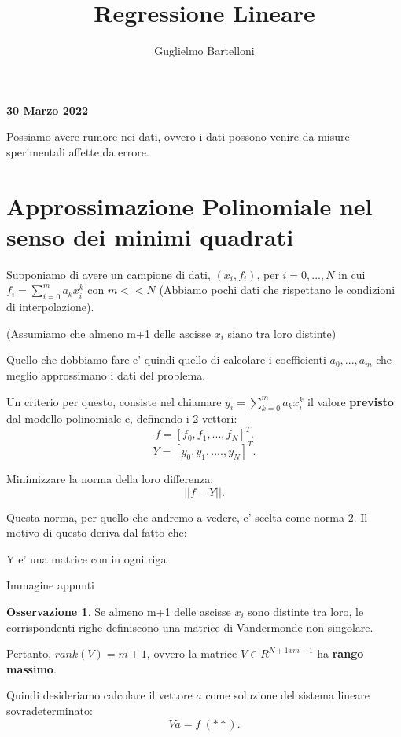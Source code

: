 \documentclass[11pt]{article}
\theoremstyle{definition}
\newtheorem{oss}{Osservazione}
\theoremstyle{plain}
\begin{document}
\title{Regressione Lineare}
\author{Guglielmo Bartelloni}
\maketitle

\thispagestyle{empty}

\begin{center}
{\LARGE \bf 30 Marzo 2022}\\
\end{center}

Possiamo avere rumore nei dati, ovvero i dati possono venire da misure sperimentali affette da errore.

\section{Approssimazione Polinomiale nel senso dei minimi quadrati}

Supponiamo di avere un campione di dati, $(x_{i},f_{i})$, per $i=0,...,N$ in cui $f_{i}=\sum_{i=0}^{m} a_kx_{i}^{k}$  con $m<<N$ 
(Abbiamo pochi dati che rispettano le condizioni di interpolazione).

(Assumiamo che almeno m+1 delle ascisse $x_{i}$ siano tra loro distinte)

Quello che dobbiamo fare e' quindi quello di calcolare i coefficienti $a_0,...,a_m$ che meglio approssimano i dati del problema.

Un criterio per questo, consiste nel chiamare $y_{i}=\sum_{k=0}^{m} a_kx_{i}^{k}$ il valore \textbf{previsto} dal modello polinomiale e, definendo i 2 vettori:
\[
	f=[f_0,f_1,...,f_N]^{T}
.\] 
\[
	Y=[y_0,y_1,....,y_N]^{T}
.\] 

Minimizzare la norma della loro differenza:
\[
||f-Y||
.\] 

Questa norma, per quello che andremo a vedere, e' scelta come norma 2. Il motivo di questo deriva dal fatto che:

Y e' una matrice con in ogni riga

Immagine appunti

\begin{oss}
	Se almeno m+1 delle ascisse ${x_{i}}$ sono distinte tra loro, le corrispondenti righe definiscono una matrice di Vandermonde non singolare.

	Pertanto, $rank(V)=m+1$, ovvero la matrice $V\in R^{N+1xm+1}$ ha \textbf{rango massimo}. 
\end{oss}

Quindi desideriamo calcolare il vettore $a$  come soluzione del sistema lineare sovradeterminato:
	\[
		Va=f\ (**)
	.\] 
\end{document}
